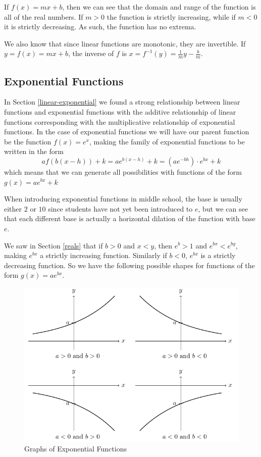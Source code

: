 \documentclass[
]{book}
\theoremstyle{definition}
\theoremstyle{definition}
\theoremstyle{definition}
\theoremstyle{definition}
\theoremstyle{remark}
\begin{document}
If \(f(x)=mx+b\), then we can see that the domain and range of the function is all of the real numbers. If \(m>0\) the function is strictly increasing, while if \(m<0\) it is strictly decreasing. As such, the function has no extrema.

We also know that since linear functions are monotonic, they are invertible. If \(y=f(x)=mx+b\), the inverse of \(f\) is \(x=f^{-1}(y)= \frac{1}{m} y-\frac{b}{m}\).

\hypertarget{exponential-functions}{%
\subsection{Exponential Functions}\label{exponential-functions}}

In Section \ref{linear-exponential} we found a strong relationship between linear functions and exponential functions with the additive relationship of linear functions corresponding with the multiplicative relationship of exponential functions. In the case of exponential functions we will have our parent function be the function \(f(x)=e^x\), making the family of exponential functions to be written in the form \[a f(b(x-h))+k = a e^{b(x-h)}+k = (ae^{-bh}) \cdot e^{bx} +k\] which means that we can generate all possibilities with functions of the form
\(g(x)=a e^{bx} + k\)

When introducing exponential functions in middle school, the base is usually either \(2\) or \(10\) since students have not yet been introduced to \(e\), but we can see that each different base is actually a horizontal dilation of the function with base \(e\).

We saw in Section \ref{reals} that if \(b>0\) and \(x<y\), then \(e^b>1\) and \(e^{bx}<e^{by}\), making \(e^{bx}\) a strictly increasing function. Similarly if \(b<0\), \(e^{bx}\) is a strictly decreasing function. So we have the following possible shapes for functions of the form \(g(x)=ae^{bx}\).

\begin{figure}

{\centering \includegraphics[width=0.9\linewidth]{tikz/exp5} 

}

\caption{Graphs of Exponential Functions}\label{fig:unnamed-chunk-69}
\end{figure}
\end{document}

